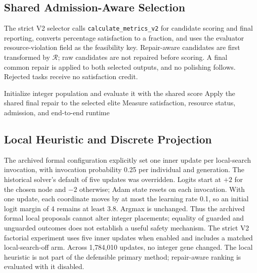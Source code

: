 \documentclass[pdflatex,sn-mathphys-num]{sn-jnl}
\begin{document}
\subsection{Shared Admission-Aware Selection}
The strict V2 selector calls \texttt{calculate\_metrics\_v2} for candidate scoring and final reporting, converts percentage satisfaction to a fraction, and uses the evaluator resource-violation field as the feasibility key. Repair-aware candidates are first transformed by $\mathcal{R}$; raw candidates are not repaired before scoring. A final common repair is applied to both selected outputs, and no polishing follows. Rejected tasks receive no satisfaction credit.

\begin{algorithm}[t]
\caption{Corrected repair-aware evolutionary search; local heuristic is optional}
\label{alg:mca_official}
\SetAlgoLined
{}
Initialize integer population and evaluate it with the shared score\;
Apply the shared final repair to the selected elite\;
Measure satisfaction, resource status, admission, and end-to-end runtime\;
\end{algorithm}

\subsection{Local Heuristic and Discrete Projection}
The archived formal configuration explicitly set one inner update per local-search invocation, with invocation probability 0.25 per individual and generation. The historical solver's default of five updates was overridden. Logits start at $+2$ for the chosen node and $-2$ otherwise; Adam state resets on each invocation. With one update, each coordinate moves by at most the learning rate 0.1, so an initial logit margin of 4 remains at least 3.8. Argmax is unchanged. Thus the archived formal local proposals cannot alter integer placements; equality of guarded and unguarded outcomes does not establish a useful safety mechanism. The strict V2 factorial experiment uses five inner updates when enabled and includes a matched local-search-off arm. Across 1,784,010 updates, no integer gene changed. The local heuristic is not part of the defensible primary method; repair-aware ranking is evaluated with it disabled.
\end{document}
